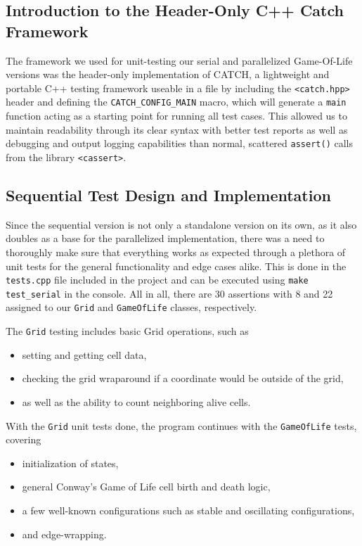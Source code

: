 \documentclass[11pt]{article}
\begin{document}
\subsection{Introduction to the Header-Only C++ Catch Framework}
The framework we used for unit-testing our serial and parallelized Game-Of-Life versions was the header-only implementation of CATCH, a lightweight and portable C++ testing framework useable in a file by including the \texttt{<catch.hpp>} header and defining the \texttt{CATCH\_CONFIG\_MAIN} macro, which will generate a \texttt{main} function acting as a starting point for running all test cases. This allowed us to maintain readability through its clear syntax with better test reports as well as debugging and output logging capabilities than normal, scattered \texttt{assert()} calls from the library \texttt{<cassert>}.

\subsection{Sequential Test Design and Implementation}
Since the sequential version is not only a standalone version on its own, as it also doubles as a base for the parallelized implementation, there was a need to thoroughly make sure that everything works as expected through a plethora of unit tests for the general functionality and edge cases alike. This is done in the \texttt{tests.cpp} file included in the project and can be executed using \texttt{make test\_serial} in the console. All in all, there are 30 assertions with 8 and 22 assigned to our \texttt{Grid} and \texttt{GameOfLife} classes, respectively.

The \texttt{Grid} testing includes basic Grid operations, such as 
\begin{itemize}
    \item setting and getting cell data,
    \item checking the grid wraparound if a coordinate would be outside of the grid,
    \item as well as the ability to count neighboring alive cells.
\end{itemize}

With the \texttt{Grid} unit tests done, the program continues with the \texttt{GameOfLife} tests, covering
\begin{itemize}
    \item initialization of states,
    \item general Conway’s Game of Life cell birth and death logic,
    \item a few well-known configurations such as stable and oscillating configurations,
    \item and edge-wrapping.
\end{itemize}
\end{document}
